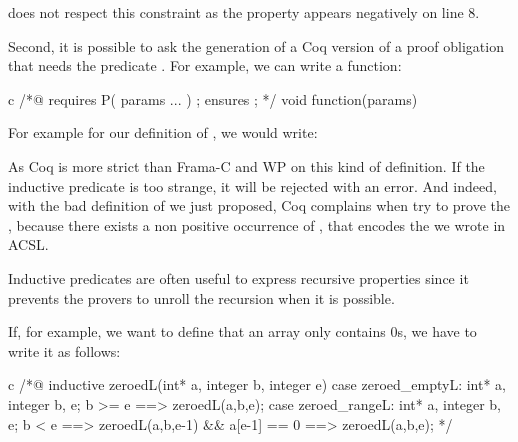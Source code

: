 
does not respect this constraint as the property 
appears negatively on line 8.

Second, it is possible to ask the generation of a Coq version of a proof
obligation that needs the predicate . For example, we can
write a function:



\begin{CodeBlock}{c}
/*@
  requires P( params ... ) ;
  ensures  \false ;
*/ void function(params){

}
\end{CodeBlock}



For example for our definition of , we would write:






As Coq is more strict than Frama-C and WP on this kind of definition. If the
inductive predicate is too strange, it will be rejected with an error. And
indeed, with the bad definition of  we just proposed,
Coq complains when try to prove the , because there
exists a non positive occurrence of , that encodes
the  we wrote in ACSL.








Inductive predicates are often useful to express recursive properties since it
prevents the provers to unroll the recursion when it is possible.

If, for example, we want to define that an array only contains 0s, we have to
write it as follows:

\begin{CodeBlock}{c}
/*@
  inductive zeroed{L}(int* a, integer b, integer e){
  case zeroed_empty{L}:
    \forall int* a, integer b, e; b >= e ==> zeroed{L}(a,b,e);
  case zeroed_range{L}:
    \forall int* a, integer b, e; b < e ==>
      zeroed{L}(a,b,e-1) && a[e-1] == 0 ==> zeroed{L}(a,b,e);
  }
*/
\end{CodeBlock}

